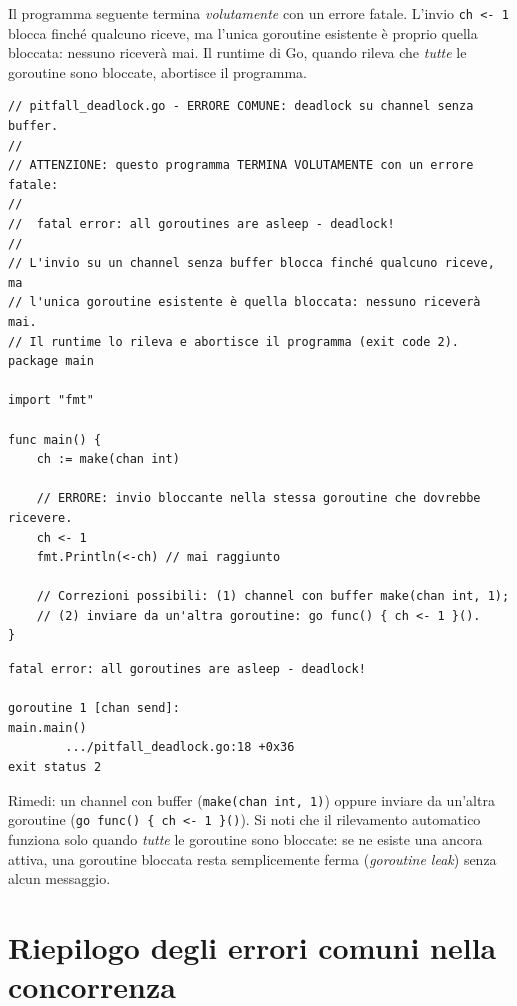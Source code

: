 \documentclass[11pt,a4paper]{report}
\newcommand{\cod}[1]{\texttt{#1}}
\begin{document}
\begin{attenzione}
Il programma seguente termina \emph{volutamente} con un errore fatale. L'invio
\cod{ch <- 1} blocca finché qualcuno riceve, ma l'unica goroutine esistente è
proprio quella bloccata: nessuno riceverà mai. Il runtime di Go, quando
rileva che \emph{tutte} le goroutine sono bloccate, abortisce il programma.

\begin{lstlisting}[style=gocode,caption={\texttt{06\_concurrency/pitfall\_deadlock.go}}]
// pitfall_deadlock.go - ERRORE COMUNE: deadlock su channel senza buffer.
//
// ATTENZIONE: questo programma TERMINA VOLUTAMENTE con un errore fatale:
//
//	fatal error: all goroutines are asleep - deadlock!
//
// L'invio su un channel senza buffer blocca finché qualcuno riceve, ma
// l'unica goroutine esistente è quella bloccata: nessuno riceverà mai.
// Il runtime lo rileva e abortisce il programma (exit code 2).
package main

import "fmt"

func main() {
	ch := make(chan int)

	// ERRORE: invio bloccante nella stessa goroutine che dovrebbe ricevere.
	ch <- 1
	fmt.Println(<-ch) // mai raggiunto

	// Correzioni possibili: (1) channel con buffer make(chan int, 1);
	// (2) inviare da un'altra goroutine: go func() { ch <- 1 }().
}
\end{lstlisting}
\begin{lstlisting}[style=output]
fatal error: all goroutines are asleep - deadlock!

goroutine 1 [chan send]:
main.main()
        .../pitfall_deadlock.go:18 +0x36
exit status 2
\end{lstlisting}
Rimedi: un channel con buffer (\cod{make(chan int, 1)}) oppure inviare da
un'altra goroutine (\cod{go func() \{ ch <- 1 \}()}). Si noti che il
rilevamento automatico funziona solo quando \emph{tutte} le goroutine sono
bloccate: se ne esiste una ancora attiva, una goroutine bloccata resta
semplicemente ferma (\emph{goroutine leak}) senza alcun messaggio.
\end{attenzione}

\section{Riepilogo degli errori comuni nella concorrenza}
\end{document}
